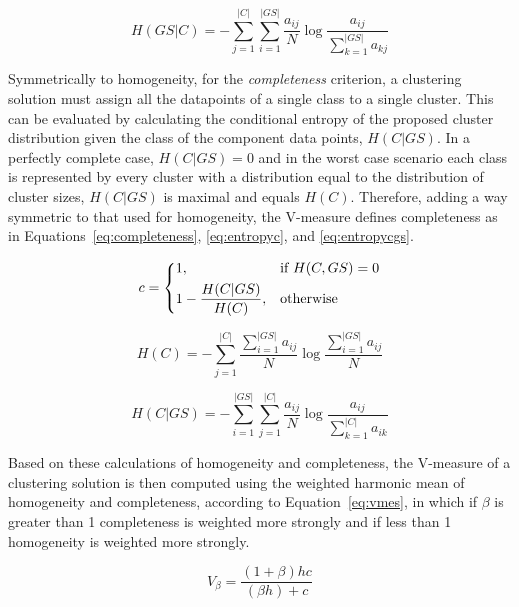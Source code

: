 \begin{equation} \label{eq:entropygsc}
 H(GS|C) = - \sum_{j=1}^{|C|} \sum_{i=1}^{|GS|} \frac{a_{ij}}{N}
           \log \frac{a_{ij}}{\sum_{k=1}^{|GS|} a_{kj}}
\end{equation}

Symmetrically to homogeneity, for the \emph{completeness} criterion, a 
clustering solution must assign all the datapoints of a single class to a 
single cluster. This can be evaluated by calculating the conditional entropy of 
the proposed cluster distribution given the class of the component data points,
$H(C|GS)$. In a perfectly complete case, $H(C|GS) = 0$ and in the worst case
scenario each class is represented by every cluster with a distribution equal to
the distribution of cluster sizes, $H(C|GS)$ is maximal and equals $H(C)$.
Therefore, adding a way symmetric to that used for homogeneity, the V-measure
defines completeness as in Equations~\ref{eq:completeness}, \ref{eq:entropyc}, 
and \ref{eq:entropycgs}.

\begin{equation} \label{eq:completeness}
 c = \begin{dcases}
      1,                        & \text{if } H(C,GS) = 0 \\
      1 - \frac{H(C|GS)}{H(C)}, & \text{otherwise} \\
     \end{dcases}
\end{equation}

\begin{equation} \label{eq:entropyc}
 H(C) = - \sum_{j=1}^{|C|} \frac{\sum_{i=1}^{|GS|} a_{ij}}{N}
        \log \frac{\sum_{i=1}^{|GS|} a_{ij}}{N}
\end{equation}

\begin{equation} \label{eq:entropycgs}
 H(C|GS) = - \sum_{i=1}^{|GS|} \sum_{j=1}^{|C|} \frac{a_{ij}}{N}
           \log \frac{a_{ij}}{\sum_{k=1}^{|C|} a_{ik}}
\end{equation}

Based on these calculations of homogeneity and completeness, the V-measure of a
clustering solution is then computed using the weighted harmonic mean of
homogeneity and completeness, according to Equation~\ref{eq:vmes}, in which if
$\beta$ is greater than 1 completeness is weighted more strongly and if less
than 1 homogeneity is weighted more strongly.

\begin{equation} \label{eq:vmes}
 V_\beta = \frac{(1+\beta)hc}{(\beta h) + c}
\end{equation}


